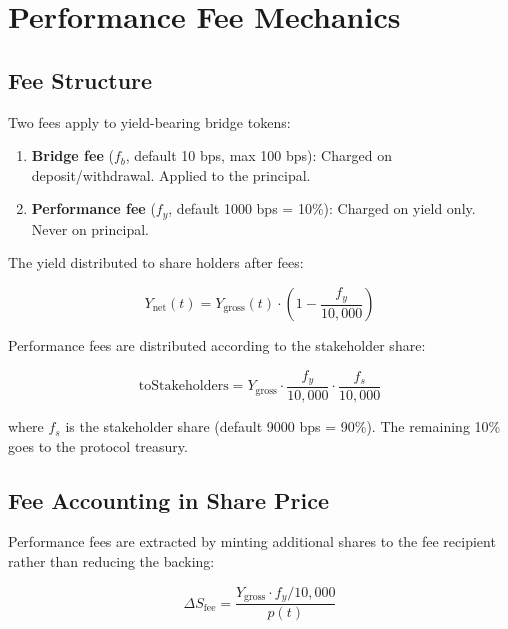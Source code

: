 \section{Performance Fee Mechanics}
\label{sec:fees}

\subsection{Fee Structure}

Two fees apply to yield-bearing bridge tokens:

\begin{enumerate}[nosep]
  \item \textbf{Bridge fee} ($f_b$, default 10 bps, max 100 bps): Charged on deposit/withdrawal. Applied to the principal.
  \item \textbf{Performance fee} ($f_y$, default 1000 bps = 10\%): Charged on yield only. Never on principal.
\end{enumerate}

The yield distributed to share holders after fees:

\begin{equation}\label{eq:net_yield}
  Y_{\text{net}}(t) = Y_{\text{gross}}(t) \cdot \left(1 - \frac{f_y}{10{,}000}\right)
\end{equation}

Performance fees are distributed according to the stakeholder share:

\begin{equation}\label{eq:fee_split}
  \text{toStakeholders} = Y_{\text{gross}} \cdot \frac{f_y}{10{,}000} \cdot \frac{f_s}{10{,}000}
\end{equation}

where $f_s$ is the stakeholder share (default 9000 bps = 90\%). The remaining 10\% goes to the protocol treasury.

\subsection{Fee Accounting in Share Price}

Performance fees are extracted by minting additional shares to the fee recipient rather than reducing the backing:

\begin{equation}\label{eq:fee_shares}
  \Delta S_{\text{fee}} = \frac{Y_{\text{gross}} \cdot f_y / 10{,}000}{p(t)}
\end{equation}

